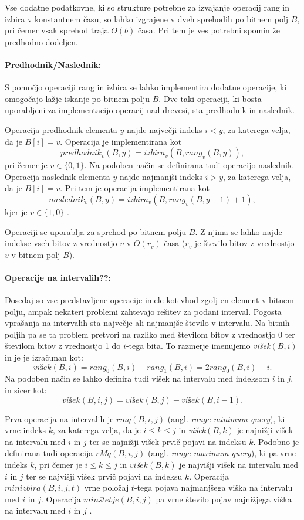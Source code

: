 Vse dodatne podatkovne, ki so strukture potrebne za izvajanje operacij rang in izbira v konstantnem času, so lahko izgrajene v dveh sprehodih po bitnem polj $B$, pri čemer vsak sprehod traja $O(b)$ časa. Pri tem je ves potrebni spomin že predhodno dodeljen.

\paragraph{Predhodnik/Naslednik:}
S pomočjo operaciji rang in izbira se lahko implementira dodatne operacije, ki omogočajo lažje iskanje po bitnem polju $B$. Dve taki operaciji, ki bosta uporabljeni za implementacijo operacij nad drevesi, sta predhodnik in naslednik.

Operacija predhodnik elementa $y$ najde največji indeks $i<y$, za katerega velja, da je $B[i]=v$. Operacija je implementirana kot
    $$predhodnik_v(B,y)=izbira_v(B,rang_v(B,y)),$$
pri čemer je $v\in \{0,1\}$. Na podoben način se definirana tudi operacijo naslednik. Operacija naslednik elementa $y$ najde najmanjši indeks $i>y$, za katerega velja, da je $B[i]=v$. Pri tem je operacija implementirana kot
    $$naslednik_v(B,y)=izbira_v(B,rang_v(B,y-1)+1),$$
kjer je $v\in \{1,0\}$ \cite{Navarro2016}.

Operaciji se uporablja za sprehod po bitnem polju $B$. Z njima se lahko najde indekse vseh bitov z vrednostjo $v$ v $O(r_v)$ časa ($r_v$ je število bitov z vrednostjo $v$ v bitnem polj $B$).

\paragraph{Operacije na intervalih??:}
Dosedaj so vse predstavljene operacije imele kot vhod zgolj en element v bitnem polju, ampak nekateri problemi zahtevajo rešitev za podani interval. Pogosta vprašanja na intervalih sta največje ali najmanjše število v intervalu. Na bitnih poljih pa se ta problem pretvori na razliko med številom bitov z vrednostjo 0 ter številom bitov z vrednostjo 1 do $i$-tega bita. To razmerje imenujemo \textit{višek}$(B,i)$ in je je izračunan kot:
$$
    \textit{višek}(B,i)=rang_0(B,i)-rang_1(B,i)=2rang_0(B,i)-i.
$$
Na podoben način se lahko definira tudi višek na intervalu med indeksom $i$ in $j$, in sicer kot:
$$
    \textit{višek}(B,i,j)=\textit{višek}(B,j)-\textit{višek}(B,i-1).
$$

Prva operacija na intervalih je $rmq(B,i,j)$ (angl. \textit{range minimum query}), ki vrne indeks $k$, za katerega velja, da je $i\le k\le j$ in \textit{višek}$(B,k)$ je najnižji višek na intervalu med $i$ in $j$ ter se najnižji višek prvič pojavi na indeksu $k$. Podobno je definirana tudi operacija $rMq(B,i,j)$ (angl. \textit{range maximum query}), ki pa vrne indeks $k$, pri čemer je $i\le k\le j$ in $vi$\textit{š}$ek(B,k)$ je najvišji višek na intervalu med $i$ in $j$ ter se najvišji višek prvič pojavi na indeksu $k$. Operacija $minizbira(B,i,j,t)$ vrne položaj $t$-tega pojava najmanjšega viška na intervalu med $i$ in $j$. Operacija $min$\textit{š}$tetje(B,i,j)$ pa vrne število pojav najnižjega viška na intervalu med $i$ in $j$ \cite{Navarro2016}.

